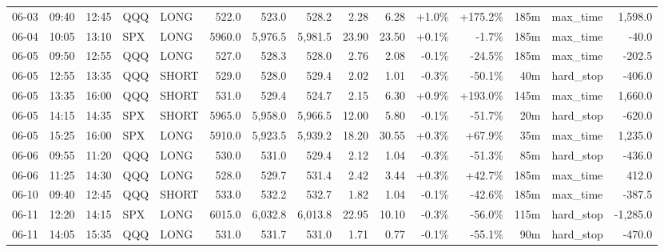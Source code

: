 \documentclass[11pt,a4paper,twoside]{article}
\begin{document}
\begin{landscape}
\begin{center}
\begin{longtable}{>{\color{txtmain}}l l l l l r r r r r r r r >{\color{txtmain}}l r}
06-03 & 09:40 & 12:45 & QQQ & LONG & 522.0 & 523.0 & 528.2 & 2.28 & 6.28 & \textcolor{wingreen}{+1.0\%} & \textcolor{wingreen}{+175.2\%} & 185m & max\_time & \textcolor{wingreen}{1,598.0} \\
06-04 & 10:05 & 13:10 & SPX & LONG & 5960.0 & 5,976.5 & 5,981.5 & 23.90 & 23.50 & \textcolor{wingreen}{+0.1\%} & \textcolor{lossred}{-1.7\%} & 185m & max\_time & \textcolor{lossred}{-40.0} \\
06-05 & 09:50 & 12:55 & QQQ & LONG & 527.0 & 528.3 & 528.0 & 2.76 & 2.08 & \textcolor{lossred}{-0.1\%} & \textcolor{lossred}{-24.5\%} & 185m & max\_time & \textcolor{lossred}{-202.5} \\
06-05 & 12:55 & 13:35 & QQQ & SHORT & 529.0 & 528.0 & 529.4 & 2.02 & 1.01 & \textcolor{lossred}{-0.3\%} & \textcolor{lossred}{-50.1\%} & 40m & hard\_stop & \textcolor{lossred}{-406.0} \\
06-05 & 13:35 & 16:00 & QQQ & SHORT & 531.0 & 529.4 & 524.7 & 2.15 & 6.30 & \textcolor{wingreen}{+0.9\%} & \textcolor{wingreen}{+193.0\%} & 145m & max\_time & \textcolor{wingreen}{1,660.0} \\
06-05 & 14:15 & 14:35 & SPX & SHORT & 5965.0 & 5,958.0 & 5,966.5 & 12.00 & 5.80 & \textcolor{lossred}{-0.1\%} & \textcolor{lossred}{-51.7\%} & 20m & hard\_stop & \textcolor{lossred}{-620.0} \\
06-05 & 15:25 & 16:00 & SPX & LONG & 5910.0 & 5,923.5 & 5,939.2 & 18.20 & 30.55 & \textcolor{wingreen}{+0.3\%} & \textcolor{wingreen}{+67.9\%} & 35m & max\_time & \textcolor{wingreen}{1,235.0} \\
06-06 & 09:55 & 11:20 & QQQ & LONG & 530.0 & 531.0 & 529.4 & 2.12 & 1.04 & \textcolor{lossred}{-0.3\%} & \textcolor{lossred}{-51.3\%} & 85m & hard\_stop & \textcolor{lossred}{-436.0} \\
06-06 & 11:25 & 14:30 & QQQ & LONG & 528.0 & 529.7 & 531.4 & 2.42 & 3.44 & \textcolor{wingreen}{+0.3\%} & \textcolor{wingreen}{+42.7\%} & 185m & max\_time & \textcolor{wingreen}{412.0} \\
06-10 & 09:40 & 12:45 & QQQ & SHORT & 533.0 & 532.2 & 532.7 & 1.82 & 1.04 & \textcolor{lossred}{-0.1\%} & \textcolor{lossred}{-42.6\%} & 185m & max\_time & \textcolor{lossred}{-387.5} \\
06-11 & 12:20 & 14:15 & SPX & LONG & 6015.0 & 6,032.8 & 6,013.8 & 22.95 & 10.10 & \textcolor{lossred}{-0.3\%} & \textcolor{lossred}{-56.0\%} & 115m & hard\_stop & \textcolor{lossred}{-1,285.0} \\
06-11 & 14:05 & 15:35 & QQQ & LONG & 531.0 & 531.7 & 531.0 & 1.71 & 0.77 & \textcolor{lossred}{-0.1\%} & \textcolor{lossred}{-55.1\%} & 90m & hard\_stop & \textcolor{lossred}{-470.0} \\

\end{longtable}
\end{center}
\end{landscape}
\end{document}
